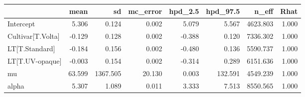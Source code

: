 \begin{tabular}{lrrrrrrr}
\toprule
{} &   mean &       sd &  mc\_error &  hpd\_2.5 &  hpd\_97.5 &    n\_eff &  Rhat \\
\midrule
Intercept         &  5.306 &    0.124 &     0.002 &    5.079 &     5.567 & 4623.803 & 1.000 \\
Cultivar[T.Volta] & -0.129 &    0.128 &     0.002 &   -0.388 &     0.120 & 7336.302 & 1.000 \\
LT[T.Standard]    & -0.184 &    0.156 &     0.002 &   -0.480 &     0.136 & 5590.737 & 1.000 \\
LT[T.UV-opaque]   & -0.003 &    0.154 &     0.002 &   -0.314 &     0.289 & 6151.636 & 1.000 \\
mu                & 63.599 & 1367.505 &    20.130 &    0.003 &   132.591 & 4549.239 & 1.000 \\
alpha             &  5.307 &    1.089 &     0.011 &    3.333 &     7.513 & 8550.565 & 1.000 \\
\bottomrule
\end{tabular}
